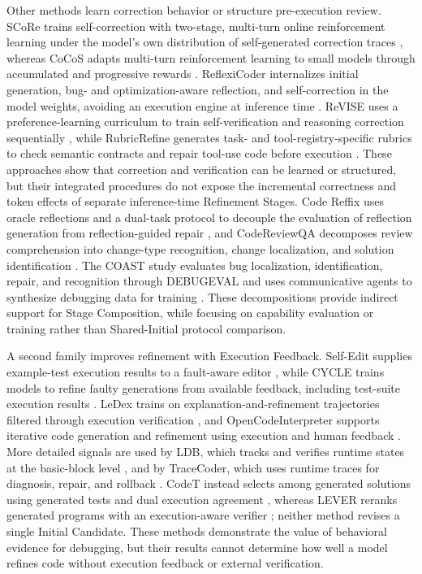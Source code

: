 Other methods learn correction behavior or structure pre-execution review.
SCoRe trains self-correction with two-stage, multi-turn online reinforcement learning under the model's own distribution of self-generated correction traces \cite{kumar2025score}, whereas CoCoS adapts multi-turn reinforcement learning to small models through accumulated and progressive rewards \cite{cho-etal-2025-self}.
ReflexiCoder internalizes initial generation, bug- and optimization-aware reflection, and self-correction in the model weights, avoiding an execution engine at inference time \cite{jiang-etal-2026-reflexicoder}.
ReVISE uses a preference-learning curriculum to train self-verification and reasoning correction sequentially \cite{pmlr-v267-lee25ab}, while RubricRefine generates task- and tool-registry-specific rubrics to check semantic contracts and repair tool-use code before execution \cite{levine2026rubricrefine}.
These approaches show that correction and verification can be learned or structured, but their integrated procedures do not expose the incremental correctness and token effects of separate inference-time Refinement Stages.
Code Reffix uses oracle reflections and a dual-task protocol to decouple the evaluation of reflection generation from reflection-guided repair \cite{di-etal-2026-code}, and CodeReviewQA decomposes review comprehension into change-type recognition, change localization, and solution identification \cite{lin-etal-2025-codereviewqa}.
The COAST study evaluates bug localization, identification, repair, and recognition through DEBUGEVAL and uses communicative agents to synthesize debugging data for training \cite{yang-etal-2025-coast}.
These decompositions provide indirect support for Stage Composition, while focusing on capability evaluation or training rather than Shared-Initial protocol comparison.

A second family improves refinement with Execution Feedback.
Self-Edit supplies example-test execution results to a fault-aware editor \cite{zhang-etal-2023-self}, while CYCLE trains models to refine faulty generations from available feedback, including test-suite execution results \cite{ding2024cycle}.
LeDex trains on explanation-and-refinement trajectories filtered through execution verification \cite{jiang2024ledex}, and OpenCodeInterpreter supports iterative code generation and refinement using execution and human feedback \cite{zheng-etal-2024-opencodeinterpreter}.
More detailed signals are used by LDB, which tracks and verifies runtime states at the basic-block level \cite{zhong-etal-2024-debug}, and by TraceCoder, which uses runtime traces for diagnosis, repair, and rollback \cite{huang2026tracecoder}.
CodeT instead selects among generated solutions using generated tests and dual execution agreement \cite{chen2023codet}, whereas LEVER reranks generated programs with an execution-aware verifier \cite{pmlr-v202-ni23b}; neither method revises a single Initial Candidate.
These methods demonstrate the value of behavioral evidence for debugging, but their results cannot determine how well a model refines code without execution feedback or external verification.

